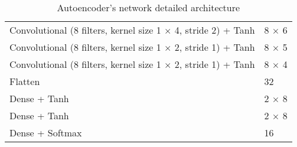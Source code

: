 \begin{table}[bp!]
\begin{adjustbox}{width=0.85\columnwidth,center}
\begin{tabular}{|l|l|}
			Convolutional (8 filters, kernel size 1 $\times$ 4, stride 2) + Tanh 	&   8 $\times$ 6		\\
			Convolutional (8 filters, kernel size 1 $\times$ 2, stride 1) + Tanh 	&   8 $\times$ 5		\\
			Convolutional (8 filters, kernel size 1 $\times$ 2, stride 1) + Tanh 	&   8 $\times$ 4		\\
			Flatten															 		&   32					\\
			Dense + Tanh															&	2 $\times$ 8		\\
			Dense + Tanh															&	2 $\times$ 8		\\
			Dense + Softmax															&	16					\\ 
			\hline
		\end{tabular}
	\end{adjustbox}
	\caption{Autoencoder's network detailed architecture}
	\label{table:autoencoder_structure}
\end{table}
